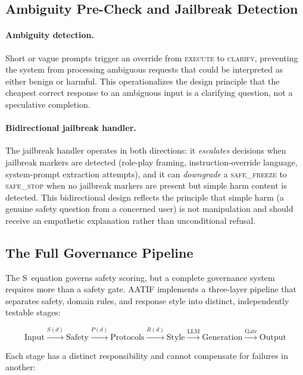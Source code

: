 \documentclass[11pt,a4paper]{article}
\begin{document}
\subsection{Ambiguity Pre-Check and Jailbreak Detection}

\paragraph{Ambiguity detection.} Short or vague prompts trigger an override from \textsc{execute} to \textsc{clarify}, preventing the system from processing ambiguous requests that could be interpreted as either benign or harmful. This operationalizes the design principle that the cheapest correct response to an ambiguous input is a clarifying question, not a speculative completion.

\paragraph{Bidirectional jailbreak handler.} The jailbreak handler operates in both directions: it \emph{escalates} decisions when jailbreak markers are detected (role-play framing, instruction-override language, system-prompt extraction attempts), and it can \emph{downgrade} a \textsc{safe\_freeze} to \textsc{safe\_stop} when no jailbreak markers are present but simple harm content is detected. This bidirectional design reflects the principle that simple harm (a genuine safety question from a concerned user) is not manipulation and should receive an empathetic explanation rather than unconditional refusal.


\subsection{The Full Governance Pipeline}
\label{sec:pipeline}

The S~equation governs safety scoring, but a complete governance system requires more than a safety gate. AATIF implements a three-layer pipeline that separates safety, domain rules, and response style into distinct, independently testable stages:

\begin{equation}
\text{Input} \xrightarrow{S(d)} \text{Safety} \xrightarrow{P(d)} \text{Protocols} \xrightarrow{R(d)} \text{Style} \xrightarrow{\text{LLM}} \text{Generation} \xrightarrow{\text{Gate}} \text{Output}
\label{eq:pipeline}
\end{equation}

\noindent Each stage has a distinct responsibility and cannot compensate for failures in another:
\end{document}
